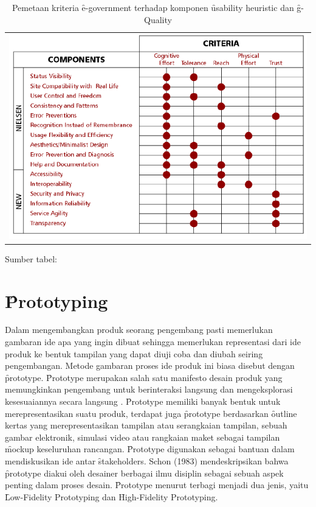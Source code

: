 \begin{table}
	\centering
	\caption{Pemetaan kriteria \f{e-government} terhadap komponen \f{usability heuristic} dan \f{g-Quality}}
	\label{tab:mappingegov}
	\begin{tabular}{c}
		\includegraphics[width=\textwidth]
		{pics/mappinggq.PNG}
	\end{tabular}
	\begin{center}
		{\small Sumber tabel: \citep{paper.garcia}}
	\end{center}
\end{table}
\section{\f{Prototyping}}\label{subsec:proto}
Dalam mengembangkan produk seorang pengembang pasti memerlukan gambaran ide apa yang ingin dibuat sehingga memerlukan representasi dari ide produk ke bentuk tampilan yang dapat diuji coba dan diubah seiring pengembangan. Metode gambaran proses ide produk ini biasa disebut dengan \f{prototype}. \f{Prototype} merupakan salah satu manifesto desain produk yang memungkinkan pengembang untuk berinteraksi langsung dan mengeksplorasi kesesuaiannya secara langsung \citep{buku.preece}. \f{Prototype} memiliki banyak bentuk untuk merepresentasikan suatu produk, terdapat juga \f{prototype} berdasarkan \f{outline} kertas yang merepresentasikan tampilan atau serangkaian tampilan, sebuah gambar elektronik, simulasi video atau rangkaian maket sebagai tampilan \f{mockup} keseluruhan rancangan. \f{Prototype} digunakan sebagai bantuan dalam mendiskusikan ide antar \f{stakeholders}. Schon (1983) mendeskripsikan bahwa \f{prototype} diakui oleh desainer berbagai ilmu disiplin sebagai sebuah aspek penting dalam proses desain. \f{Prototype} menurut \citet{buku.preece} terbagi menjadi dua jenis, yaitu \f{Low-Fidelity Prototyping} dan \f{High-Fidelity Prototyping}.
